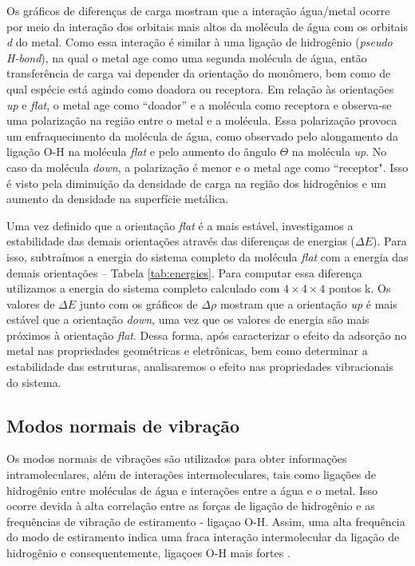 Os gráficos de diferenças de carga mostram que a interação água/metal ocorre por meio da interação dos orbitais mais altos da molécula de água com os orbitais \textit{d} do metal. Como essa interação é similar à uma ligação de hidrogênio (\textit{pseudo H-bond}), na qual o metal age como uma segunda molécula de água, então transferência de carga vai depender da orientação do monômero, bem como de qual espécie está agindo como doadora ou receptora. Em relação às orientações \textit{up} e \textit{flat}, o metal age como ``doador'' e a molécula como receptora e observa-se uma polarização na região entre o metal e a molécula. Essa polarização provoca um enfraquecimento da molécula de água, como observado pelo alongamento da ligação O-H na molécula \textit{flat} e pelo aumento do ângulo $\Theta$ na molécula \textit{up}. No caso da molécula \textit{down}, a polarização é menor e o metal age como ``receptor". Isso é visto pela diminuição da densidade de carga na região dos hidrogênios e um aumento da densidade na superfície metálica. 


Uma vez definido que a orientação \textit{flat} é a mais estável, investigamos a estabilidade das demais orientações através das diferenças de energias ($ \Delta E$). Para isso, subtraímos a energia do sistema completo da molécula \textit{flat} com a energia das demais orientações -- Tabela \ref{tab:energies}. Para computar essa diferença utilizamos a energia do sistema completo calculado com $ 4\times4\times4 $ pontos k. Os valores de $ \Delta E $ junto com os gráficos de $ \Delta\rho $ mostram que a orientação \textit{up} é mais estável que a orientação \textit{down}, uma vez que os valores de energia são mais próximos à orientação \textit{flat}. Dessa forma, após caracterizar o efeito da adsorção no metal nas propriedades geométricas e eletrônicas, bem como determinar a estabilidade das estruturas, analisaremos o efeito nas propriedades vibracionais do sistema.


\subsection*{Modos normais de vibração}
 Os modos normais de vibrações são utilizados para obter informações intramoleculares, além de interações intermoleculares, tais como ligações de hidrogênio entre moléculas de água e interações entre a água e o metal. Isso ocorre devida à alta correlação entre as forças de ligação de hidrogênio e as frequências de vibração de estiramento - ligaçao O-H. Assim, uma alta frequência do modo de estiramento indica uma fraca interação intermolecular da ligação de hidrogênio e consequentemente, ligaçoes O-H mais fortes \cite{modos}. 

